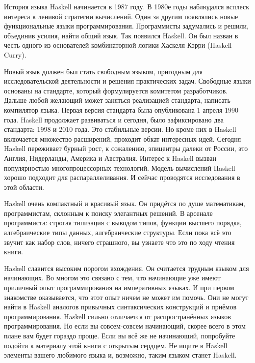 
История языка Haskell начинается в 1987 году. 
В 1980е годы наблюдался всплеск интереса к ленивой
стратегии вычислений. 
Один за другим появлялись новые функциональные
языки программирования. Программисты задумались и решили, 
объединив усилия, найти общий язык. Так появился 
Haskell. Он был назван в честь одного из основателей 
комбинаторной логики Хаскеля Кэрри (Haskell Curry). 

Новый язык должен был стать свободным языком, пригодным
для исследовательской деятельности и решения практических задач.
Свободные языки основаны на стандарте, который формулируется
комитетом разработчиков. Дальше любой желающий может 
заняться реализацией стандарта, написать компилятор языка.
Первая версия стандарта была опубликована 1 апреля
1990 года.
Haskell продолжает развиваться и сегодня, было зафиксировано
два стандарта: 1998 и 2010 года. Это стабильные версии.
Но кроме них в Haskell включается множество расширений,
проходит обкат интересных идей. 
Сегодня Haskell переживает бурный рост, к сожалению, 
эпицентры далеки от России, это Англия, Нидерланды, Америка 
и Австралия. Интерес к Haskell вызван популярностью
многопроцессорных технологий. Модель вычислений Haskell
хорошо подходит для распараллеливания. И сейчас проводятся 
исследования в этой области.

Haskell очень компактный и красивый язык.
Он придётся по душе математикам, программистам, склонным
к поиску элегантных решений. В арсенале программиста:
строгая типизация с выводом типов, функции высшего порядка, 
алгебраические типы данных, алгебраические структуры. 
Если пока всё это звучит как набор слов, ничего страшного,
вы узнаете что это по ходу чтения книги.


Haskell славится высоким порогом вхождения. 
Он считается трудным языком для начинающих.
Во многом это связано с тем, что начинающие уже имеют
приличный опыт программирования на императивных языках. И при
первом знакомстве оказывается, что этот опыт ничем не может
им помочь. Они не могут найти в Haskell аналогов привычных
синтаксических конструкций и приёмов программирования. 
Haskell сильно отличается от распространённых
языков программирования. Но если вы совсем-совсем начинающий,
скорее всего в этом плане вам будет гораздо проще. 
Если вы всё же не начинающий, попробуйте подойти к материалу
этой книги с открытым сердцем. Не ищите в Haskell
элементы вашего любимого языка и, возможно, таким
языком станет Haskell.

